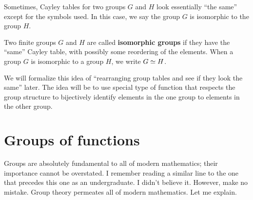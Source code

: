 \documentclass{ximera}
\begin{document}


Sometimes, Cayley tables for two groups $G$ and $H$ look essentially
``the same'' except for the symbols used. In this case, we say the
group $G$ is isomorphic to the group $H$.

\begin{definition}
  Two finite groups $G$ and $H$ are called \textbf{isomorphic groups} if
  they have the ``same'' Cayley table, with possibly some reordering
  of the elements. When a group $G$ is isomorphic to a group $H$, we
  write $G\simeq H$.
\end{definition}

We will formalize this idea of ``rearranging group tables and see if
they look the same'' later. The idea will be to use special type of
function that respects the group structure to bijectively identify
elements in the one group to elements in the other group.

\section{Groups of functions}

Groups are absolutely fundamental to all of modern mathematics; their
importance cannot be overstated. I remember reading a similar line to
the one that precedes this one as an undergraduate. I didn't believe
it. However, make no mistake. Group theory permeates all of modern
mathematics. Let me explain.
\end{document}
